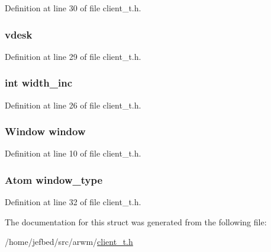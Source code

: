Definition at line 30 of file client\_\-t.h.

\hypertarget{struct_client_a6598db9e547ecfb0412173ed101b82ed}{
\subsubsection[{vdesk}]{ {\bf vdesk}}}
\label{struct_client_a6598db9e547ecfb0412173ed101b82ed}


Definition at line 29 of file client\_\-t.h.

\hypertarget{struct_client_a55924e6ed4725b3ac7197489fffe8b70}{
\subsubsection[{width\_\-inc}]{\setlength{\rightskip}{0pt plus 5cm}int {\bf width\_\-inc}}}
\label{struct_client_a55924e6ed4725b3ac7197489fffe8b70}


Definition at line 26 of file client\_\-t.h.

\hypertarget{struct_client_ac5b0b3c19d476a314bb68af9bc4a0ee0}{
\subsubsection[{window}]{\setlength{\rightskip}{0pt plus 5cm}Window {\bf window}}}
\label{struct_client_ac5b0b3c19d476a314bb68af9bc4a0ee0}


Definition at line 10 of file client\_\-t.h.

\hypertarget{struct_client_a4849f7533c04f5c569887d2bb97258ff}{
\subsubsection[{window\_\-type}]{\setlength{\rightskip}{0pt plus 5cm}Atom {\bf window\_\-type}}}
\label{struct_client_a4849f7533c04f5c569887d2bb97258ff}


Definition at line 32 of file client\_\-t.h.



The documentation for this struct was generated from the following file:\begin{DoxyCompactItemize}
\item 
/home/jefbed/src/arwm/\hyperlink{client__t_8h}{client\_\-t.h}\end{DoxyCompactItemize}
